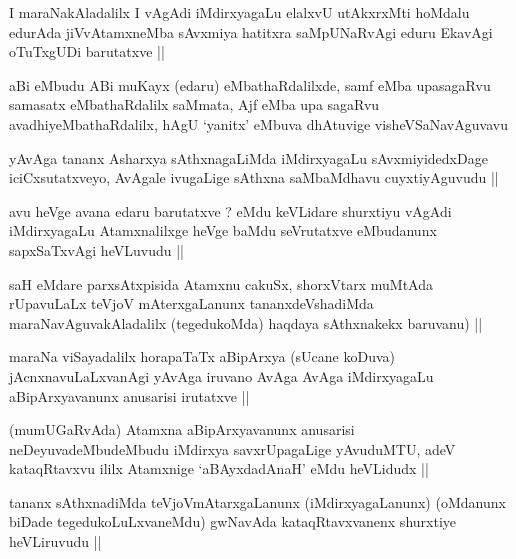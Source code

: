\begin{artha}
I maraNakAladalilx I vAgAdi iMdirxyagaLu elalxvU utAkxrxMti hoMdalu
edurAda jiVvAtamxneMba sAvxmiya hatitxra saMpUNaRvAgi eduru EkavAgi
oTuTxgUDi barutatxve ||
\end{artha}


\begin{artha}
aBi eMbudu ABi muKayx (edaru) eMbathaRdalilxde, samf eMba upasagaRvu
samasatx eMbathaRdalilx saMmata, Ajf eMba upa sagaRvu
avadhiyeMbathaRdalilx, hAgU `yanitx' eMbuva dhAtuvige visheVSaNavAguvavu
\end{artha}

\begin{artha}
yAvAga tananx Asharxya sAthxnagaLiMda iMdirxyagaLu sAvxmiyidedxDage
iciCxsutatxveyo, AvAgale ivugaLige sAthxna saMbaMdhavu cuyxtiyAguvudu ||
\end{artha}

\begin{artha}
avu heVge avana edaru barutatxve ? eMdu keVLidare shurxtiyu vAgAdi
iMdirxyagaLu Atamxnalilxge heVge baMdu seVrutatxve eMbudanunx
sapxSaTxvAgi heVLuvudu ||
\end{artha}


\begin{artha}
saH eMdare parxsAtxpisida Atamxnu cakuSx, shorxVtarx muMtAda
rUpavuLaLx teVjoV mAterxgaLanunx tananxdeVshadiMda
maraNavAguvakAladalilx (tegedukoMda) haqdaya sAthxnakekx baruvanu) ||
\end{artha}

\begin{artha}
maraNa viSayadalilx horapaTaTx aBipArxya (sUcane koDuva)
jAcnxnavuLaLxvanAgi yAvAga iruvano AvAga AvAga iMdirxyagaLu
aBipArxyavanunx anusarisi irutatxve ||
\end{artha}


\begin{artha}
(mumUGaRvAda) Atamxna aBipArxyavanunx anusarisi neDeyuvadeMbudeMbudu
  iMdirxya savxrUpagaLige yAvuduMTU, adeV kataqRtavxvu ililx Atamxnige
  `aBAyxdadAnaH' eMdu heVLidudx ||
\end{artha}

\begin{artha}
tananx sAthxnadiMda teVjoVmAtarxgaLanunx (iMdirxyagaLanunx) (oMdanunx
biDade tegedukoLuLxvaneMdu) gwNavAda kataqRtavxvanenx shurxtiye
heVLiruvudu || 
\end{artha}

